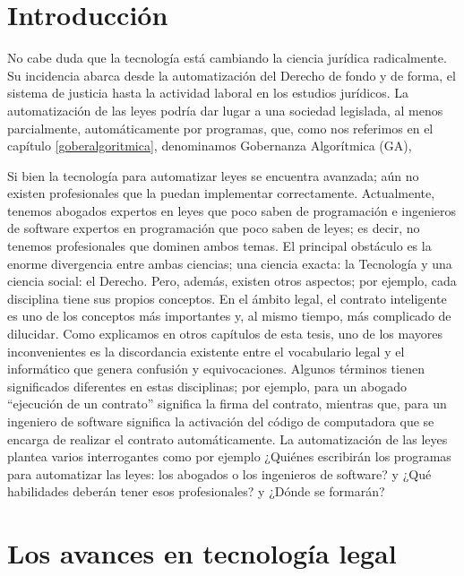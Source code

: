 \documentclass[12pt]{report} %
\begin{document}
\section{Introducción}

No cabe duda que la tecnología está cambiando la ciencia jurídica radicalmente. Su incidencia abarca desde la automatización del Derecho de fondo y de forma, el sistema de justicia hasta la actividad laboral en los estudios jurídicos. La automatización de las leyes podría dar lugar a una sociedad legislada, al menos parcialmente, automáticamente por programas, que, como nos referimos en el capítulo \ref{goberalgoritmica}, denominamos Gobernanza Algorítmica (GA), 

Si bien la tecnología para automatizar leyes se encuentra avanzada; aún no existen profesionales que la puedan implementar correctamente. Actualmente, tenemos abogados expertos en leyes que poco saben de programación e ingenieros de software expertos en programación que poco saben de leyes; es decir, no tenemos profesionales que dominen ambos temas. El principal obstáculo es la enorme divergencia entre ambas ciencias; una ciencia exacta: la Tecnología y una ciencia social: el Derecho. Pero, además, existen otros aspectos; por ejemplo, cada disciplina tiene sus propios conceptos. En el ámbito legal, el contrato inteligente es uno de los conceptos más importantes y, al mismo tiempo, más complicado de dilucidar. Como explicamos en otros capítulos de esta tesis, uno de los mayores inconvenientes es la discordancia existente entre el vocabulario legal y el informático que genera confusión y equivocaciones. Algunos términos tienen significados diferentes en estas disciplinas; por ejemplo, para un abogado “ejecución de un contrato” significa la firma del contrato, mientras que, para un ingeniero de software significa la activación del código de computadora que se encarga de realizar el contrato automáticamente. La automatización de las leyes plantea varios interrogantes como por ejemplo ¿Quiénes escribirán los programas para automatizar las leyes: los abogados o los ingenieros de software? y ¿Qué habilidades deberán tener esos profesionales? y ¿Dónde se formarán? 

\section{Los avances en tecnología legal }
\end{document}
